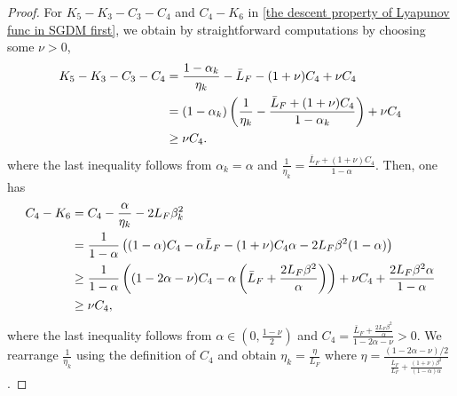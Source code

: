 \begin{proof}
    For $K_{5}- K_{3}- C_{3}- C_{4}$ and $C_{4}- K_{6}$ in \eqref{the descent property of Lyapunov func in SGDM first},
    we obtain by straightforward computations by choosing some $\nu > 0$,
    {\begin{align}
        K_{5}- K_{3}- C_{3}- C_{4}
        &= \frac{1 - \alpha_{k}}{\eta_{k}}- \bar{L}_{F}- (1 + \nu)C_{4}+ \nu C_{4}\notag\\
        &= (1 - \alpha_{k})\left(\frac{1}{\eta_{k}}- \frac{\bar{L}_{F}+ (1 + \nu)C_{4}}{1 - \alpha_{k}}\right) + \nu C_{4}\notag \\
        &\geq \nu C_{4}. \notag %
    \end{align}}
    where the last inequality follows from $\alpha_{k}= \alpha$ and
    $\frac{1}{\eta_{k}}= \frac{\bar{L}_{F}+ (1 + \nu)C_{4}}{1 - \alpha}$. Then,
    one has
    \begin{align}
        C_{4}- K_{6} & = C_{4}- \frac{\alpha}{\eta_{k}}- 2L_{F}\beta_{k}^{2}\notag                                                                                                                                   \\
                     & = \frac{1}{1 - \alpha}\left( (1 - \alpha)C_{4}- \alpha\bar{L}_{F}- (1 + \nu)C_{4}\alpha - 2L_{F}\beta^{2}(1 - \alpha) \right)\notag                                                           \\
                     & \geq \frac{1}{1 - \alpha}\left( (1 - 2\alpha - \nu)C_{4}- \alpha \left(\bar{L}_{F}+ \frac{2L_{F}\beta^{2}}{\alpha}\right) \right) + \nu C_{4}+ \frac{2L_{F}\beta^{2}\alpha}{1 - \alpha}\notag \\
                     & \geq \nu C_{4},\notag %
    \end{align}where the last inequality follows from $\alpha \in (0, \frac{1 - \nu}{2})$
    and
    $C_{4}= \frac{\bar{L}_{F}+ \frac{2L_F \beta^2}{\alpha}}{1 - 2\alpha - \nu}> 0$.
    We rearrange $\frac{1}{\eta_{k}}$ using the definition of $C_{4}$ and obtain
    $\eta_{k}= \frac{\eta}{L_{F}}$ where $\eta = \frac{(1 - 2\alpha - \nu)/2}{\frac{\bar{L}_{F}}{L_{F}}
    + \frac{(1 + \nu)\beta^{2}}{(1 - \alpha)\alpha}}$.


\end{proof}
